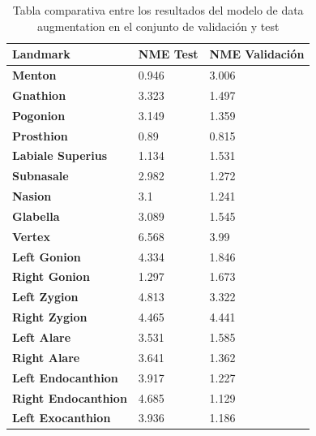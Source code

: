         \begin{table}[!ht]
            \centering
            \caption{Tabla comparativa entre los resultados del modelo de data augmentation en el conjunto de validación y test}
            \begin{tabular}{|l|l|l|}
            \hline
                \cellcolor{gray!25}\textbf{Landmark} & \cellcolor{gray!25}\textbf{NME Test} & \cellcolor{gray!25}\textbf{NME Validación} \\ \hline
                \textbf{Menton} & \cellcolor{green!25}0.946 & 3.006 \\ \hline
                \textbf{Gnathion} & 3.323 & \cellcolor{green!25}1.497 \\ \hline
                \textbf{Pogonion} & 3.149 & \cellcolor{green!25}1.359 \\ \hline
                \textbf{Prosthion} & 0.89 & \cellcolor{green!25}0.815 \\ \hline
                \textbf{Labiale Superius} & \cellcolor{green!25}1.134 & 1.531 \\ \hline
                \textbf{Subnasale} & 2.982 & \cellcolor{green!25}1.272 \\ \hline
                \textbf{Nasion} & 3.1 & \cellcolor{green!25}1.241 \\ \hline
                \textbf{Glabella} & 3.089 & \cellcolor{green!25}1.545 \\ \hline
                \textbf{Vertex} & 6.568 & \cellcolor{green!25}3.99 \\ \hline
                \textbf{Left Gonion} & 4.334 & \cellcolor{green!25}1.846 \\ \hline
                \textbf{Right Gonion} & \cellcolor{green!25}1.297 & 1.673 \\ \hline
                \textbf{Left Zygion} & 4.813 & \cellcolor{green!25}3.322 \\ \hline
                \textbf{Right Zygion} & 4.465 & \cellcolor{green!25}4.441 \\ \hline
                \textbf{Left Alare} & 3.531 & \cellcolor{green!25}1.585 \\ \hline
                \textbf{Right Alare} & 3.641 & \cellcolor{green!25}1.362 \\ \hline
                \textbf{Left Endocanthion} & 3.917 & \cellcolor{green!25}1.227 \\ \hline
                \textbf{Right Endocanthion} & 4.685 & \cellcolor{green!25}1.129 \\ \hline
                \textbf{Left Exocanthion} & 3.936 & \cellcolor{green!25}1.186 \\ \hline

\end{tabular}
\end{table}
